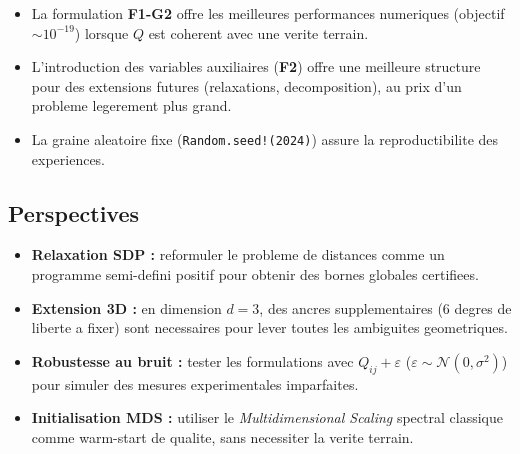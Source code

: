 \documentclass[12pt,a4paper]{article}
\begin{document}
\begin{itemize}
  \item La formulation \textbf{F1-G2} offre les meilleures performances
    numeriques (objectif $\sim 10^{-19}$) lorsque $Q$ est coherent avec
    une verite terrain.
  \item L'introduction des variables auxiliaires (\textbf{F2}) offre une
    meilleure structure pour des extensions futures (relaxations,
    decomposition), au prix d'un probleme legerement plus grand.
  \item La graine aleatoire fixe (\texttt{Random.seed!(2024)}) assure la
    reproductibilite des experiences.
\end{itemize}

\subsection{Perspectives}

\begin{itemize}
  \item \textbf{Relaxation SDP :} reformuler le probleme de distances
    comme un programme semi-defini positif pour obtenir des bornes
    globales certifiees.
  \item \textbf{Extension 3D :} en dimension $d=3$, des ancres
    supplementaires (6 degres de liberte a fixer) sont necessaires pour
    lever toutes les ambiguites geometriques.
  \item \textbf{Robustesse au bruit :} tester les formulations avec
    $Q_{ij} + \varepsilon$ ($\varepsilon \sim \mathcal{N}(0,\sigma^2)$)
    pour simuler des mesures experimentales imparfaites.
  \item \textbf{Initialisation MDS :} utiliser le
    \textit{Multidimensional Scaling} spectral classique comme
    warm-start de qualite, sans necessiter la verite terrain.
\end{itemize}
\end{document}
